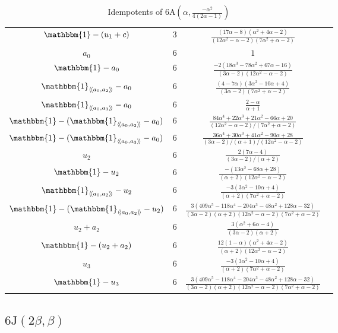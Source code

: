 \documentclass[11pt, a4paper]{article}
\theoremstyle{plain}
\theoremstyle{definition}
\newcommand\al{\alpha}
\newcommand\bt{\beta}
\newcommand\lla{\langle\!\langle}
\newcommand\rra{\rangle\!\rangle}
\newcommand{\A}{\mathrm{A}}
\newcommand{\J}{\mathrm{J}}
\newcommand{\0}{\overline{0}}
\newcommand{\2}{\overline{2}}
\newcommand{\1}{\mathbbm{1}}
\begin{document}
\begin{table}[h!tb]
\begin{tabular}{cccc}
		$\1 - (u_1+c)$ & 3 & $\frac{(17\al-8)(\al^2 + 4\al - 2)}{(12\al^2 - \al - 2)(7\al^2 + \al - 2)}$ & \\
		$a_0$ & $6$ & $1$ &  \\
		$\1 - a_0$ & $6$ & $\frac{-2(18\al^3 - 78\al^2 + 67\al - 16)}{(3\al - 2)(12\al^2 - \al - 2)}$ & \\
		$\1_{\lla a_0,a_2 \rra}-a_0$ & $6$ & $\frac{(4-7\al)(3\al^2 - 10\al + 4)}{(3\al - 2)(7\al^2 + \al - 2)}$ & \\
		$\1_{\lla a_0,a_3 \rra}-a_0$ & $6$ & $\frac{2-\al}{\al +1}$ & \\
		$\1-(\1_{\lla a_0,a_2 \rra}-a_0)$ & $6$ & $\frac{84\al^4 + 22\al^3 + 21\al^2 - 66\al + 20}{(12\al^2 - \al - 2)/(7\al^2 + \al - 2)}$ & \\
		$\1-(\1_{\lla a_0,a_3 \rra}-a_0)$ & $6$ & $\frac{36\al^4 + 30\al^3 + 41\al^2 - 90\al + 28}{(3\al - 2)/(\al + 1)/(12\al^2 - \al -2)}$ & \\
		$u_2$ & $6$ & $\frac{2(7\al - 4)}{(3\al - 2)/(\al + 2)}$ & \\
		$\1 - u_2$ & $6$ & $\frac{-(13\al^2 - 68\al + 28)}{(\al + 2)(12\al^2 - \al - 2)}$ & \\
		$\1_{\lla a_0,a_2 \rra}-u_2$ & $6$ & $\frac{-3(3\al^2 - 10\al + 4)}{(\al + 2)(7\al^2 + \al - 2)}$ & \\
		$\1-(\1_{\lla a_0,a_2 \rra}-u_2)$ & $6$ & $\frac{3(409\al^5 - 118\al^4 - 204\al^3 - 48\al^2 + 128\al - 32)}{(3\al - 2)(\al +2)(12\al^2 - \al - 2)(7\al^2 + \al - 2)}$ & \\
		$u_2+a_2$ & $6$ & $\frac{3(\al^2 + 6\al - 4)}{(3\al - 2)(\al + 2)}$ & \\
		$\1-(u_2+a_2)$ & $6$ & $\frac{12(1-\al)(\al^2 + 4\al - 2)}{(\al + 2)(12\al^2 - \al - 2)}$ & \\
		$u_3$ & $6$ & $\frac{-3(3\al^2 - 10\al + 4)}{(\al + 2)(7\al^2 + \al - 2)}$ & \\
		$\1-u_3$ & $6$ & $\frac{3(409\al^5 - 118\al^4 - 204\al^3 - 48\al^2 + 128\al - 32)}{(3\al - 2)(\al + 2)(12\al^2 - \al - 2)(7\al^2 + \al - 2)}$ & \\
	\end{tabular}
	\caption{Idempotents of $6\A(\al, \frac{-\al^2}{4(2\al-1)})$}\label{tab:6Aidempotents}
\end{table}
	
	
	

\subsection{$6\J(2\bt, \bt)$}
\end{document}
